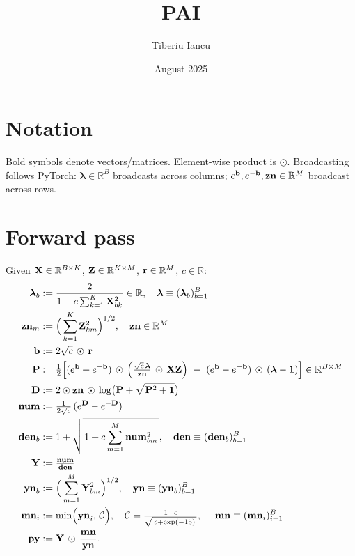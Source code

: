 \documentclass{article}
\title{PAI}
\author{Tiberiu Iancu}
\date{August 2025}
\begin{document}
\maketitle

\section*{Notation}
\newcommand{\ddfrac}[2]{\frac{\partial #1}{\partial #2}}
\newcommand{\colnorm}[1]{\left(\sum_{\text{col}} #1\right)}
\newcommand{\rownorm}[1]{\left(\sum_{\text{row}} #1\right)}
\newcommand{\lam}{\bm{\lambda}}



Bold symbols denote vectors/matrices. Element-wise product is $\odot$. Broadcasting follows PyTorch: $\lam\in\mathbb{R}^B$ broadcasts across columns; $\ev{b},\ev{-b},\v{zn}\in\mathbb{R}^M$ broadcast across rows.

\section{Forward pass}

\newcommand{\C}{\mathcal{C}}

Given $\v{X}\in\mathbb{R}^{B\times K}$, $\v{Z}\in\mathbb{R}^{K\times M}$, $\v{r}\in\mathbb{R}^{M}$, $c\in\mathbb{R}$:
\begin{align}
\lam_b &:= \frac{2}{1 - c\sum_{k=1}^K \v{X}{bk}^2}\in\mathbb{R},\quad \v{\lam}\equiv(\lam_b)_{b=1}^B \\
\v{zn}{m} &:= \Big(\sum_{k=1}^K \v{Z}{km}^2\Big)^{1/2},\quad \v{zn}\in\mathbb{R}^M \\
\v{b} &:= 2\sqrt{c}\,\odot\,\v{r}\\
\v{P} &:= \tfrac12\Big[(\ev{b}+\ev{-b})\,\odot\,\Big( \tfrac{\sqrt{c}\,\v{\lam}}{\v{zn}} \,\odot\, \v{XZ}\Big)\ -\ (\ev{b}-\ev{-b})\,\odot\,(\lam-\mathbf{1})\Big] \in \mathbb{R}^{B\times M} \\
\v{D} &:= 2\odot \v{zn}\,\odot\, \log\!\big(\v{P}+\sqrt{\v{P}^2+\mathbf{1}}\big) \\
\v{num} &:= \tfrac{1}{2\sqrt{c}}\,(\ev{D}-\ev{-D}) \\
\v{den}{b} &:= 1 + \sqrt{\,1 + c \sum_{m=1}^M \v{num}{bm}^2\,},\quad \v{den}\equiv(\v{den}{b})_{b=1}^B \\
\v{Y} &:= \tfrac{\v{num}}{\v{den}} \\
\v{yn}_b &:= \Big(\sum_{m=1}^M \v{Y}{bm}^2\Big)^{1/2},\quad \v{yn}\equiv(\v{yn}_b)_{b=1}^B \\
\v{mn}_i &:= \min\!\Big(\v{yn}{i},\,\C\Big),\quad \C = \tfrac{1-\epsilon}{\sqrt{\,c+\exp(-15)\,}},\ \quad \v{mn}\equiv(\v{mn}_i)_{i=1}^B \\
\v{py} &:= \v{Y}\,\odot\,\frac{\v{mn}}{\v{yn}}.
\end{align}
\end{document}
